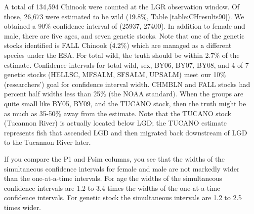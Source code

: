 \documentclass[12pt]{article}
\begin{document}
A total of 134,594 Chinook were counted at the LGR observation window. Of those, 26,673 were estimated to be wild (19.8\%, Table \ref{table:CHresults90}). We obtained a 90\% confidence interval of (25937, 27400). In addition to female and male, there are five ages, and seven genetic stocks. Note that one of the genetic stocks identified is FALL Chinook (4.2\%) which are managed as a different species under the ESA. For total wild, the truth should be within 2.7\% of the estimate.  Confidence intervals for total wild, sex, BY06, BY07, BY08, and 4 of 7 genetic stocks (HELLSC, MFSALM, SFSALM, UPSALM) meet our 10\% (researchers') goal for confidence interval width. CHMBLN and FALL stocks had percent half widths less than 25\% (the NOAA standard). When the groups are quite small like BY05, BY09, and the TUCANO stock, then the truth might be as much as 35-50\% away from the estimate. Note that the TUCANO stock (Tucannon River) is actually located below LGD; the TUCANO estimate represents fish that ascended LGD and then migrated back downstream of LGD to the Tucannon River later. 

If you compare the P1 and Psim columns, you see that the widths of the simultaneous confidence intervals for female and male are not markedly wider than the one-at-a-time intervals. For age the widths of the simultaneous confidence intervals are 1.2 to 3.4 times the widths of the one-at-a-time confidence intervals. For genetic stock the simultaneous intervals are 1.2 to 2.5 times wider.
\end{document}
